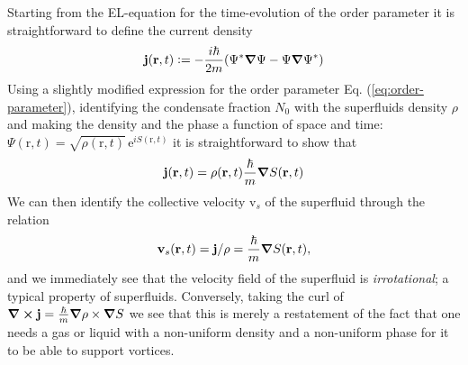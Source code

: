 \documentclass[11pt,a4paper,twoside]{article}
\renewcommand{\vec}[1]{\bm{\mathrm{#1}}}
\newcommand{\unit}[1]{\,\mathrm{#1}}
\begin{document}
			Starting from the EL-equation for the time-evolution of the order parameter it is straightforward to define the current density
			\begin{align}
				\vec{j}(\vec{r},t) \vcentcolon= -\frac{i\hbar}{2m}\qty(\Psi^*\grad{\Psi} - \Psi\grad{\Psi^*})
			\end{align}
			Using a slightly modified expression for the order parameter Eq. (\ref{eq:order-parameter}), identifying the condensate fraction $N_0$ with the superfluids density $\rho$ and making the density and the phase a function of space and time: $\Psi(\vec{r},t) = \sqrt{\rho(\vec{r},t)}\unit{e}^{iS(\vec{r},t)}$ it is straightforward to show that
			\begin{align}
				\vec{j}(\vec{r},t) = \rho(\vec{r},t)\frac{\hbar}{m}\grad{S(\vec{r},t)}
			\end{align} 
			We can then identify the collective velocity $\vec{v}_s$ of the superfluid through the relation
			\begin{align}
				\vec{v}_s(\vec{r},t) = \vec{j}/\rho=\frac{\hbar}{m}\grad{S(\vec{r},t)},
			\end{align}
			and we immediately see that the velocity field of the superfluid is \emph{irrotational}; a typical property of superfluids. Conversely, taking the curl of $\curl{\vec{j}}=\frac{\hbar}{m}\grad{\rho}\times\grad{S}$ we see that this is merely a restatement of the fact that one needs a gas or liquid with a non-uniform density and a non-uniform phase for it to be able to support vortices.\\
			
\end{document}
